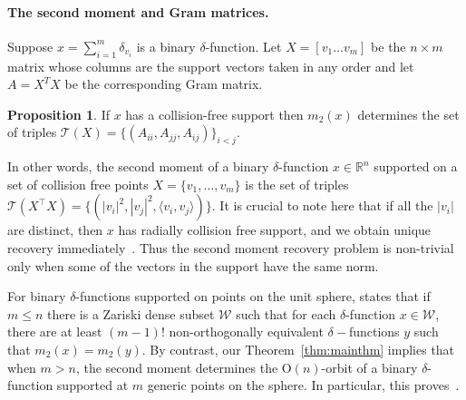 \documentclass{article}
\theoremstyle{definition}
\newtheorem{Proposition}{Proposition}
\newcommand{\Span}{\mathrm{Span}}
\newcommand{\W}{\mathcal{W}}
\renewcommand{\r}{\mathbb{R}}
\newcommand{\ip}[2]{\langle {#1}, {#2} \rangle}
\renewcommand{\|}{|}
\renewcommand{\t}{\mathcal{T}}
\renewcommand{\O}{\mathrm{O}}
\begin{document}
\paragraph{{\bf The second moment and Gram matrices.}} Suppose $x = \sum_{i =1}^m \delta_{v_i}$ is a binary $\delta$-function. Let
$X= [v_1 \ldots v_m]$ be the $n \times m$ matrix whose columns are the support vectors taken in any order 
and let $A = X^TX$ be the corresponding Gram matrix.
\begin{Proposition}{\cite[Proposition 4.1]{bendory2024beltway}}\label{prop:triples}
If $x$ has a collision-free support then $m_2(x)$ determines the set of triples
$\mathcal{T}(X) = \{(A_{ii}, A_{jj}, A_{ij})\}_{i < j}.$
\end{Proposition}
In other words, the second moment of a binary $\delta$-function $x \in \r^n$ supported on
a set of collision free points $X= \{v_1, \ldots , v_m\}$ is the set of triples $\t(X^\top X) = \{(\|v_i\|^2, \|v_j\|^2, \ip{v_i}{v_j})\}$. It is crucial to note here that if all the $\|v_i\|$ are distinct, then $x$ has radially collision free support, and we obtain unique recovery immediately~\cite{bendory2024beltway}. Thus the second moment recovery problem is non-trivial only when 
some of the vectors in the support have the same norm. 

For binary $\delta$-functions supported on points on the unit sphere, \cite[Proposition 5.2]{bendory2024beltway} states that if $m \leq n$ there is a Zariski dense subset $\W$ such that for each $\delta$-function $x \in \W$, there are at least $(m-1)!$ non-orthogonally equivalent $\delta-$functions $y$ such that $m_2(x) = m_2(y)$. 
By contrast, our Theorem~\ref{thm:mainthm} implies that when $m>n$, the second moment determines the $\O(n)$-orbit
of a binary $\delta$-function supported at $m$ generic points on the sphere. In particular, this proves~\cite[Conjecture 5.4]{bendory2024beltway}. 


\end{document}
